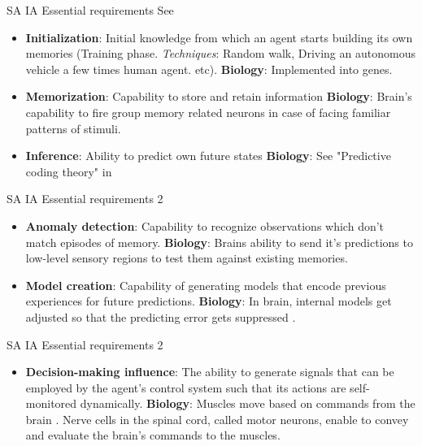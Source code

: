 \documentclass[handout]{beamer}
\begin{document}
\begin{frame}{SA IA Essential requirements}
	See \cite{regazzoni-2020-multi-sensorial-generative-and-descriptive-self-awareness-models-for-autonomous-systems}
	\begin{itemize}
		\item \textbf{Initialization}: Initial knowledge from which an agent starts building its own memories (Training phase. \emph{Techniques}: Random walk, Driving an autonomous vehicle a few times human agent. etc). \textbf{Biology}: Implemented into genes.
		\item \textbf{Memorization}: Capability to store and retain information \textbf{Biology}: Brain's capability to fire group memory related neurons in case of facing familiar patterns of stimuli. 
		\item \textbf{Inference}: Ability to predict own future states \textbf{Biology}: See "Predictive coding theory" in \cite{seth-2013-interoceptive-inference-emotion-and-the-embodied-self}
	\end{itemize}
\end{frame}

\begin{frame}{SA IA Essential requirements 2}
	\begin{itemize}
		\item \textbf{Anomaly detection}: Capability to recognize observations which don't match episodes of memory. \textbf{Biology}: Brains ability to send it's predictions to low-level sensory regions to test them against existing memories.
		\item \textbf{Model creation}: Capability of generating models that encode previous experiences for future predictions. \textbf{Biology}: In brain, internal models get adjusted so that the predicting error gets suppressed \cite{friston-2010-the-free-energy-principle-a-unified-brain-theory}.
	\end{itemize}
\end{frame}

\begin{frame}{SA IA Essential requirements 2}
	\begin{itemize}
		\item \textbf{Decision-making influence}: The ability to generate signals that can be employed by the agent’s control system such that its actions are self-monitored dynamically. \textbf{Biology}: Muscles move based on commands from the brain \cite{rizzolatti-1996-premotor-cortex-and-the-recognition-of-motor-actions}. Nerve cells in the spinal cord, called motor neurons, enable to convey and evaluate the brain’s commands to the muscles.
	\end{itemize}
\end{frame}
\end{document}
